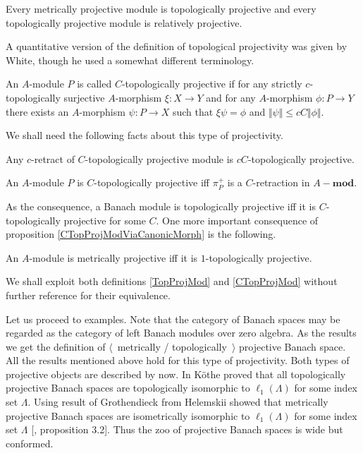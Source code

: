 \begin{proposition}\label{MetProjIsTopProjAndTopProjIsRelProj} Every metrically projective module is topologically projective and every topologically projective module is relatively projective.
\end{proposition}

A quantitative version of the definition of topological projectivity was given by White, though he used a somewhat different terminology.

\begin{definition}\label{CTopProjMod} An $A$-module $P$ is called  $C$-topologically projective if for any strictly $c$-topologically surjective $A$-morphism $\xi:X\to Y$ and for any $A$-morphism $\phi:P\to Y$ there exists an $A$-morphism $\psi:P\to X$ such that $\xi\psi=\phi$ and $\Vert \psi\Vert\leq c C\Vert\phi\Vert$.
\end{definition}

We shall need the following facts about this type of projectivity.

\begin{proposition}\label{RetrCTopProjIsCTopProj} Any $c$-retract of $C$-topologically projective module is $cC$-topologically projective.
\end{proposition}

\begin{proposition}\label{CTopProjModViaCanonicMorph} An $A$-module $P$ is $C$-topologically projective iff $\pi_P^+$ is a $C$-retraction in $A-\mathbf{mod}$.
\end{proposition}

As the consequence, a Banach module is topologically projective iff it is $C$-topologically projective for some $C$. One more important consequence of proposition \ref{CTopProjModViaCanonicMorph} is the following.

\begin{proposition}\label{MetProjIsOneTopProj} An $A$-module is metrically projective iff it is $1$-topologically projective.
\end{proposition}

We shall exploit both definitions \ref{TopProjMod} and \ref{CTopProjMod} without further reference for their equivalence. 

Let us proceed to examples. Note that the category of Banach spaces may be regarded as the category of left Banach modules over zero algebra. As the results we get the definition of $\langle$~metrically / topologically~$\rangle$ projective Banach space. All the results mentioned above hold for this type of projectivity. Both types of projective objects are described by now. In \cite{KotheTopProjBanSp} K{\"o}the proved that all topologically projective Banach spaces are topologically isomorphic to $\ell_1(\Lambda)$ for some index set $\Lambda$. Using result of Grothendieck from \cite{GrothMetrProjFlatBanSp} Helemskii showed that metrically projective Banach spaces are isometrically isomorphic to $\ell_1(\Lambda)$ for some index set $\Lambda$ [\cite{HelMetrFrQMod}, proposition 3.2]. Thus the zoo of projective Banach spaces is wide but conformed.

